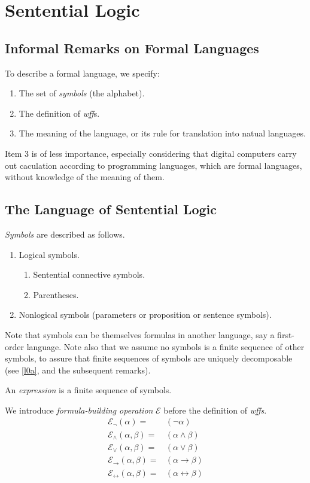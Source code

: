 \chapter{Sentential Logic}
\setcounter{section}{-1}

\section{Informal Remarks on Formal Languages}

To describe a formal language, we specify:
\begin{enumerate}
  \item The set of \textit{symbols} (the alphabet).
  \item The definition of \textit{wff}s.
  \item The meaning of the language, or its rule for translation into natual languages.
\end{enumerate}

Item 3 is of less importance, especially considering that digital computers carry out caculation according to programming languages, which are formal languages, without knowledge of the meaning of them.

\section{The Language of Sentential Logic}

\textit{Symbols} are described as follows.
\begin{enumerate}
  \item Logical symbols.
        \begin{enumerate}
          \item Sentential connective symbols.
          \item Parentheses.
        \end{enumerate}
  \item Nonlogical symbols (parameters or proposition or sentence symbols).
\end{enumerate}

Note that symbols can be themselves formulas in another language, say a first-order language. Note also that we assume no symbols is a finite sequence of other symbols, to assure that finite sequences of symbols are uniquely decomposable (see \ref{l0a}, and the subsequent remarks).

An \textit{expression} is a finite sequence of symbols.

We introduce \textit{formula-building operation} $\mathcal{E}$ before the definition of \textit{wffs}.
\begin{align*}
  \mathcal{E}_{\neg}(\alpha)=                  & (\neg \alpha)                 \\
  \mathcal{E}_{\wedge}(\alpha,\beta)=          & (\alpha\wedge \beta)          \\
  \mathcal{E}_{\vee}(\alpha,\beta)=            & (\alpha\vee \beta)            \\
  \mathcal{E}_{\rightarrow}(\alpha,\beta)=     & (\alpha\rightarrow \beta)     \\
  \mathcal{E}_{\leftrightarrow}(\alpha,\beta)= & (\alpha\leftrightarrow \beta)
\end{align*}

